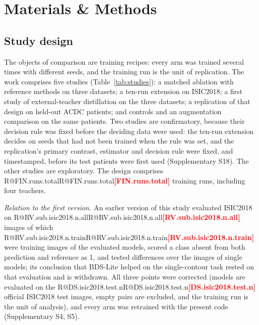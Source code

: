 \documentclass[fleqn,10pt,lineno]{wlpeerj}
\makeatletter
\newcommand{\R}[1]{\ifcsname R@#1\endcsname\csname R@#1\endcsname\else\textbf{\textcolor{red}{[#1]}}\fi}
\makeatother
\begin{document}
\section*{Materials \& Methods}

\subsection*{Study design}
The objects of comparison are training recipes: every arm was trained several times with different seeds, and the training run is the unit of replication. The work comprises five studies (Table~\ref{tab:studies}): a matched ablation with reference methods on three datasets; a ten-run extension on ISIC2018; a first study of external-teacher distillation on the three datasets; a replication of that design on held-out ACDC patients; and controls and an augmentation comparison on the same patients. Two studies are confirmatory, because their decision rule was fixed before the deciding data were used: the ten-run extension decides on seeds that had not been trained when the rule was set, and the replication's primary contrast, estimator and decision rule were fixed, and timestamped, before its test patients were first used (Supplementary S18). The other studies are exploratory. The design comprises \R{FIN.runs.total} training runs, including four teachers.

\begin{table}[!tb]
\centering
\begin{threeparttable}

\caption{\label{tab:studies}Studies, runs and test data. Confirmatory: the decision rule was fixed before the deciding runs (study 2, fresh seeds) or test patients (study 4) were used. Arm abbreviations: Table~\ref{tab:arms}. Protocols: Supplementary S13, S15, S17, S18, S21.}
\end{threeparttable}
\end{table}

\emph{Relation to the first version.} An earlier version of this study evaluated ISIC2018 on \R{RV.sub.isic2018.n.all} images of which \R{RV.sub.isic2018.n.train} were training images of the evaluated models, scored a class absent from both prediction and reference as 1, and tested differences over the images of single models; its conclusion that BDS-Lite helped on the single-contour task rested on that evaluation and is withdrawn. All three points were corrected (models are evaluated on the \R{DS.isic2018.test.n} official ISIC2018 test images, empty pairs are excluded, and the training run is the unit of analysis), and every arm was retrained with the present code (Supplementary S4, S5).
\end{document}
